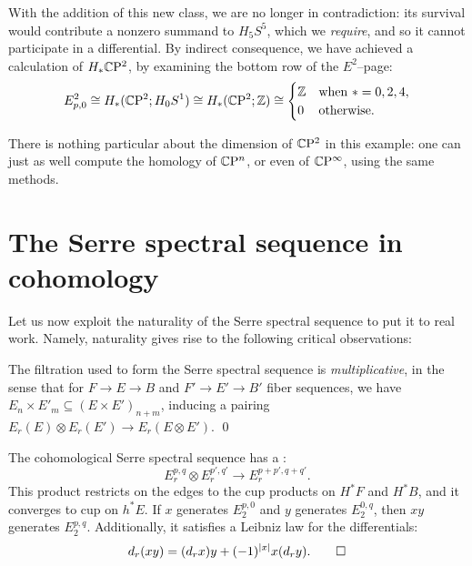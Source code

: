 \begin{example}
\noindent
With the addition of this new class, we are no longer in contradiction: its survival would contribute a nonzero summand to $H_5 S^5$, which we \emph{require}, and so it cannot participate in a differential.
By indirect consequence, we have achieved a calculation of $H_* \mathbb C \mathrm{P}^2$, by examining the bottom row of the $E^2$--page: \[E^2_{p, 0} \cong H_*(\mathbb C \mathrm{P}^2; H_0 S^1) \cong H_*(\mathbb C \mathrm{P}^2; \mathbb Z) \cong \begin{cases} \mathbb Z & \text{when $* = 0, 2, 4$}, \\ 0 & \text{otherwise}. \end{cases}\]

There is nothing particular about the dimension of $\mathbb C \mathrm{P}^2$ in this example: one can just as well compute the homology of $\mathbb C \mathrm{P}^n$, or even of $\mathbb C \mathrm{P}^\infty$, using the same methods.
\end{example}




\section{The Serre spectral sequence in cohomology}

Let us now exploit the naturality of the Serre spectral sequence to put it to real work.
Namely, naturality gives rise to the following critical observations:

\begin{lemma}
The filtration used to form the Serre spectral sequence is \emph{multiplicative}, in the sense that for $F \to E \to B$ and $F' \to E' \to B'$ fiber sequences, we have $E_n \times E'_m \subseteq (E \times E')_{n+m}$, inducing a pairing $E_r(E) \otimes E_r(E') \to E_r(E \otimes E')$.
\qed
\end{lemma}

\begin{corollary}\label{LeibinzInSSS}
The cohomological Serre spectral sequence has a : \[E_r^{p, q} \otimes E_r^{p', q'} \to E_r^{p+p', q+q'}.\]
This product restricts on the edges to the cup products on $H^* F$ and $H^* B$, and it converges to cup on $h^* E$.
If $x$ generates $E_2^{p, 0}$ and $y$ generates $E_2^{0, q}$, then $xy$ generates $E_2^{p, q}$.
Additionally, it satisfies a Leibniz law for the differentials: \[d_r(x y) = (d_r x) y + (-1)^{|x|} x (d_r y). \qed\]
\end{corollary}

